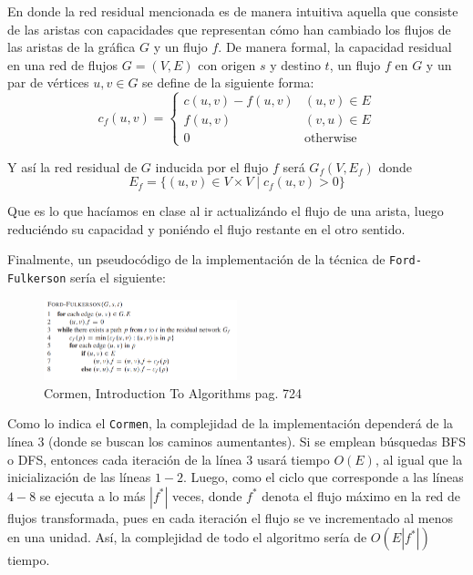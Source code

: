\documentclass[letterpaper,11pt]{article}
\begin{document}
\begin{enumerate}
    En donde la red residual mencionada es de manera intuitiva aquella que 
    consiste de las aristas con capacidades que representan cómo han 
    cambiado los flujos de las aristas de la gráfica $G$ y un flujo $f$. 
    De manera formal, la capacidad residual en una red de flujos $G = (V, E)$
    con origen $s$ y destino $t$, un flujo $f$ en $G$ y un par de vértices 
    $u,v \in G$ se define de la siguiente forma:
    \begin{equation*}
        c_f(u,v) = 
        \begin{cases}
            c(u,v) - f(u,v) & (u,v) \in E \\ 
            f(u,v) & (v,u) \in E \\ 
            0 & \text{otherwise}
        \end{cases}
    \end{equation*}

    Y así la red residual de $G$ inducida por el flujo $f$ será $G_f(V, E_f)$ 
    donde
    \begin{equation*}
        E_f = \{(u,v) \in V \times V \; | \; c_f(u,v) > 0\}
    \end{equation*} 

    Que es lo que hacíamos en clase al ir actualizándo el flujo de una arista, 
    luego reduciéndo su capacidad y poniéndo el flujo restante en el otro 
    sentido.

    Finalmente, un pseudocódigo de la implementación de la técnica de 
    \texttt{Ford-Fulkerson} sería el siguiente:
    \begin{figure}[H]
        \centering
        \includegraphics[width=0.5\textwidth]{imagenes/pseudo.png}
        \caption{Cormen, Introduction To Algorithms pag. 724}
        \label{fig:algoritmo}
    \end{figure}

    Como lo indica el \texttt{Cormen}, la complejidad de la implementación 
    dependerá de la línea $3$ (donde se buscan los caminos aumentantes).
    Si se emplean búsquedas BFS o DFS, entonces cada iteración de la línea 
    $3$ usará tiempo $O(E)$, al igual que la inicialización de las líneas 
    $1-2$. Luego, como el ciclo que corresponde a las líneas $4-8$ se 
    ejecuta a lo más $|f^*|$ veces, donde $f^*$ denota el flujo máximo en 
    la red de flujos transformada, pues en cada iteración el flujo se ve 
    incrementado al menos en una unidad. Así, la complejidad de todo el 
    algoritmo sería de $O(E|f^*|)$ tiempo.


\end{enumerate}
\end{document}
